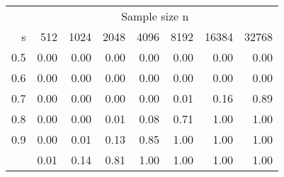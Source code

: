 
\begin{tabular}[t]{rrrrrrrr}
\toprule
\multicolumn{1}{c}{ } & \multicolumn{7}{c}{Sample size n} \\
\cmidrule(l{3pt}r{3pt}){2-8}
s & 512 & 1024 & 2048 & 4096 & 8192 & 16384 & 32768\\
\midrule
0.5 & 0.00 & 0.00 & 0.00 & 0.00 & 0.00 & 0.00 & 0.00\\
0.6 & 0.00 & 0.00 & 0.00 & 0.00 & 0.00 & 0.00 & 0.00\\
0.7 & 0.00 & 0.00 & 0.00 & 0.00 & 0.01 & 0.16 & 0.89\\
0.8 & 0.00 & 0.00 & 0.01 & 0.08 & 0.71 & 1.00 & 1.00\\
0.9 & 0.00 & 0.01 & 0.13 & 0.85 & 1.00 & 1.00 & 1.00\\
\addlinespace
1.0 & 0.01 & 0.14 & 0.81 & 1.00 & 1.00 & 1.00 & 1.00\\
\bottomrule
\end{tabular}
